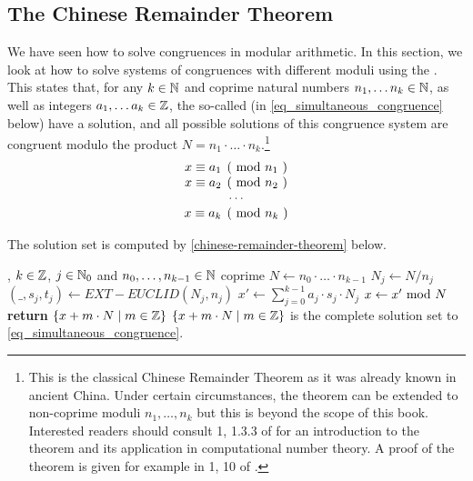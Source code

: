 \subsection{The Chinese Remainder Theorem} We have seen how to solve congruences in modular arithmetic. In this section, we look at how to solve systems of congruences with different moduli using the . This states that, for any $ k \in \mathbb{N} $ and coprime natural numbers $ n_1, \ldots n_k \in \mathbb{N} $, as well as integers $ a_1, \ldots a_k \in \mathbb{Z} $, the so-called  (in \ref{eq_simultaneous_congruence}
 below) have a solution, and all possible solutions of this congruence system are congruent modulo
the product $N= n_1 \cdot \ldots \cdot n_k $.\footnote{This is the classical Chinese Remainder Theorem as it was already known in ancient China. Under certain circumstances, the theorem can be extended to non-coprime moduli $ n_1, \ldots, n_k $ but this is beyond the scope of this book. Interested readers should consult \chaptname{} 1, \secname{} 1.3.3 of \cite{cohen-2010} for an introduction to the theorem and its application in computational number theory. A proof of the theorem is given for example in \chaptname{} 1, \secname{} 10 of \cite{mignotte-1992}.} 
\begin{equation}
\label{eq_simultaneous_congruence}
\begin{array}{c}
\kongru{x}{a_1}{n_1} \\
\kongru{x}{a_2}{n_2} \\
\cdots \\
\kongru{x}{a_k}{n_k} \\
\end{array}
\end{equation}

The solution set is computed by \algname{} \ref{chinese-remainder-theorem} below. 
\begin{algorithm}\caption{Chinese Remainder Theorem}
\label{chinese-remainder-theorem}
\begin{algorithmic}[0]
\Require , $k\in \mathbb{Z}$, $j\in \mathbb{N}_0$ and $n_0,\ldots,n_{k-1} \in \mathbb{N}$ coprime
\State $N\gets n_0\cdot \ldots \cdot n_{k-1}$
\State $N_j\gets N/n_j$
\State $(\_,s_j,t_j)\gets EXT-EUCLID (N_j,n_j)$
\EndWhile
\State $x'\gets \sum_{j=0}^{k-1}a_j\cdot s_j\cdot N_j$
\State $x\gets x' \text{ mod } N$
\State \textbf{return} $\{x+ m\cdot N\;|\; m\in \mathbb{Z}\}$
\EndProcedure
\Ensure $\{x+ m\cdot N\;|\; m\in \mathbb{Z}\}$ is the complete solution set to \ref{eq_simultaneous_congruence}.
\end{algorithmic}
\end{algorithm}


